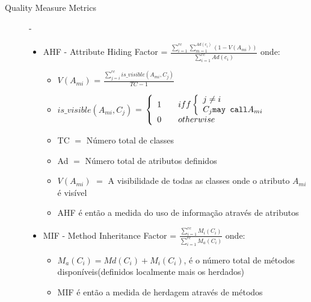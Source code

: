 \begin{description}
 \item [Quality Measure Metrics] - \begin{itemize}
								   
				   \item AHF - Attribute Hiding Factor = $ \frac{\sum_{i=1}^{rc} \sum_{m=1}^{Ad(c_i)} (1-V(A_{mi}))} {\sum_{i=1}^{rc} Ad(c_i)} $ onde: \begin{itemize}
																				      \item $V(A_{mi})$ = $\frac{\sum_{j=i}^{rc} is\_visible(A_{mi},C_j)}{TC-1} $
																				      \item $ is\_visible(A_{mi},C_j) $ = \( \left \{ \begin{array}{l l}
																									      1 & \quad iff \left \{ \begin{array}{l l}
																									                              j \neq i \\
																												      C_j \texttt{may call} A_{mi}\\
																									                             \end{array}
\right.\\
																									      0 & \quad otherwise\\
																									    \end{array} \right. \)
																				      \item TC $=$ Número total de classes
																				      \item Ad $=$ Número total de atributos definidos
																				      \item $V(A_{mi})$ $=$ A visibilidade de todas as classes onde o atributo $A_{mi}$ é visível
																				      \item AHF é então a medida do uso de informação através de atributos
																				    \end{itemize}
				   \item MIF - Method Inheritance Factor = $ \frac{\sum_{i=1}^{rc} M_i(C_i)}{\sum_{i=1}^{rc} M_a(C_i)} $ onde: \begin{itemize}
				                                                                                                                \item $ M_a(C_i) = Md(C_i) + M_i(C_i)$, é o número total de métodos disponíveis(definidos localmente mais os herdados)
				                                                                                                                \item MIF é então a medida de herdagem através de métodos

\end{itemize}
\end{itemize}
\end{description}
